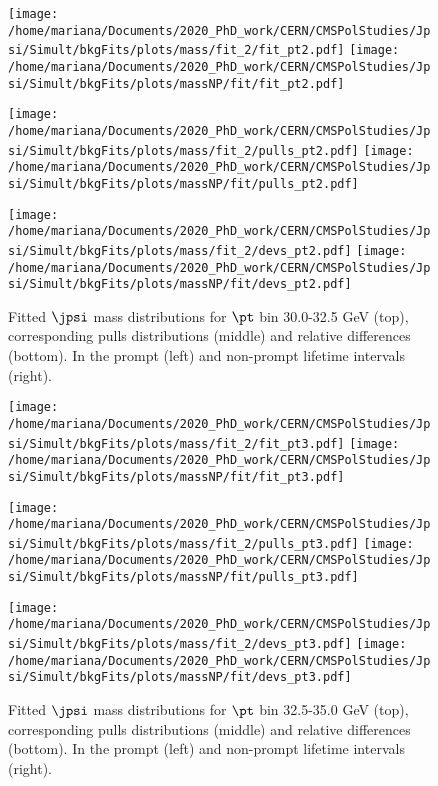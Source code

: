 \pagebreak

\begin{figure}[h!]
\centering
\texttt{[image: /home/mariana/Documents/2020\_PhD\_work/CERN/CMSPolStudies/Jpsi/Simult/bkgFits/plots/mass/fit\_2/fit\_pt2.pdf]}
\texttt{[image: /home/mariana/Documents/2020\_PhD\_work/CERN/CMSPolStudies/Jpsi/Simult/bkgFits/plots/massNP/fit/fit\_pt2.pdf]}

\texttt{[image: /home/mariana/Documents/2020\_PhD\_work/CERN/CMSPolStudies/Jpsi/Simult/bkgFits/plots/mass/fit\_2/pulls\_pt2.pdf]}
\texttt{[image: /home/mariana/Documents/2020\_PhD\_work/CERN/CMSPolStudies/Jpsi/Simult/bkgFits/plots/massNP/fit/pulls\_pt2.pdf]}

\texttt{[image: /home/mariana/Documents/2020\_PhD\_work/CERN/CMSPolStudies/Jpsi/Simult/bkgFits/plots/mass/fit\_2/devs\_pt2.pdf]}
\texttt{[image: /home/mariana/Documents/2020\_PhD\_work/CERN/CMSPolStudies/Jpsi/Simult/bkgFits/plots/massNP/fit/devs\_pt2.pdf]}
\caption{Fitted $\jpsi$ mass distributions for $\pt$ bin 30.0-32.5 GeV (top), corresponding pulls distributions (middle) and relative differences (bottom). In the prompt (left) and non-prompt lifetime intervals (right).}\label{f:m_fit_2}
\end{figure}

\pagebreak

\begin{figure}[h!]
\centering
\texttt{[image: /home/mariana/Documents/2020\_PhD\_work/CERN/CMSPolStudies/Jpsi/Simult/bkgFits/plots/mass/fit\_2/fit\_pt3.pdf]}
\texttt{[image: /home/mariana/Documents/2020\_PhD\_work/CERN/CMSPolStudies/Jpsi/Simult/bkgFits/plots/massNP/fit/fit\_pt3.pdf]}

\texttt{[image: /home/mariana/Documents/2020\_PhD\_work/CERN/CMSPolStudies/Jpsi/Simult/bkgFits/plots/mass/fit\_2/pulls\_pt3.pdf]}
\texttt{[image: /home/mariana/Documents/2020\_PhD\_work/CERN/CMSPolStudies/Jpsi/Simult/bkgFits/plots/massNP/fit/pulls\_pt3.pdf]}

\texttt{[image: /home/mariana/Documents/2020\_PhD\_work/CERN/CMSPolStudies/Jpsi/Simult/bkgFits/plots/mass/fit\_2/devs\_pt3.pdf]}
\texttt{[image: /home/mariana/Documents/2020\_PhD\_work/CERN/CMSPolStudies/Jpsi/Simult/bkgFits/plots/massNP/fit/devs\_pt3.pdf]}
\caption{Fitted $\jpsi$ mass distributions for $\pt$ bin 32.5-35.0 GeV (top), corresponding pulls distributions (middle) and relative differences (bottom). In the prompt (left) and non-prompt lifetime intervals (right).}\label{f:m_fit_3}
\end{figure}

